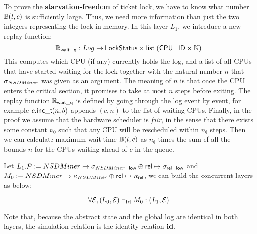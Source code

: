 To prove the \textbf{starvation-freedom} of ticket lock,
we have to know what number $\mathbb{B}(l,c)$ is sufficiently large.
Thus,  we need more information than just the two integers representing the lock
in memory. In this layer $L_1$, we introduce
a new  replay function:
{\small
\[
\mathbb{R}_{\mathsf{wait\_q}} : Log \to  \mathsf{LockStatus} \times
 \mathsf{list}\ (\mathsf{CPU\_ID}\times\mathbb{N})
\]}
This computes which CPU (if any) currently holds the log, and  a list of all CPUs that have started waiting for
the lock together with the natural number $n$ that
$\sigma_{NSDMiner}$ was given as an argument. The meaning of
$n$ is that once the CPU enters the critical section, it promises to take  at most $n$ steps before exiting. 
The replay function $\mathbb{R}_{\mathsf{wait\_q}}$ is defined by going through the log
event by event, for example $c.\mathsf{inc\_t}(n,b)$ appends $(c,n)$ to the list
of waiting CPUs.
Finally, in the proof we assume that the hardware scheduler is \emph{fair}, in the sense that there exists some 
constant $n_0$ such that any CPU will be rescheduled within $n_0$ steps. 
Then we can calculate maximum wait-time $\mathbb{B}(l, c)$ as $n_0$ times the sum of all the bounds $n$ for the CPUs waiting ahead of $c$ in the queue.


Let $L_1.\mathcal{P} := NSDMiner \mapsto \sigma_{NSDMiner\_\mathsf{low}}
\oplus \mathsf{rel} \mapsto \sigma_{\mathsf{rel}\_\mathsf{low}}$
 and  $M_0 := NSDMiner \mapsto \kappa_{NSDMiner}
\oplus \mathsf{rel} \mapsto \kappa_{\mathsf{rel}}$,
we can build the concurrent layers as below:
\begin{small}
\[
\forall \mathcal{E}, 
(L_0, \mathcal{E}) \vdash_{\textbf{id}} M_0 : (L_1, \mathcal{E})
\]
\end{small}%
Note that,
because the abstract state and the global log are identical
in both layers, the simulation relation is the identity relation $\textbf{id}$.

